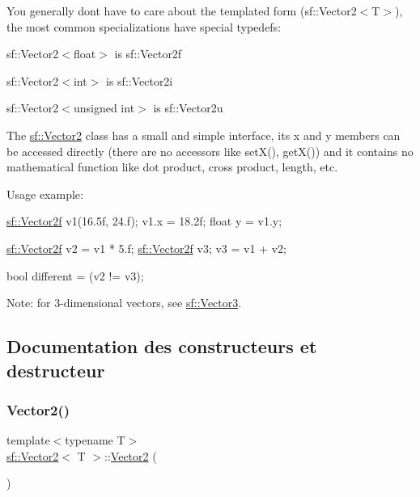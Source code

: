 You generally don\textquotesingle{}t have to care about the templated form (sf\+::\+Vector2$<$\+T$>$), the most common specializations have special typedefs\+: \begin{DoxyItemize}
\item sf\+::\+Vector2$<$float$>$ is sf\+::\+Vector2f \item sf\+::\+Vector2$<$int$>$ is sf\+::\+Vector2i \item sf\+::\+Vector2$<$unsigned int$>$ is sf\+::\+Vector2u\end{DoxyItemize}
The \hyperlink{classsf_1_1Vector2}{sf\+::\+Vector2} class has a small and simple interface, its x and y members can be accessed directly (there are no accessors like set\+X(), get\+X()) and it contains no mathematical function like dot product, cross product, length, etc.

Usage example\+: 
\begin{DoxyCode}
\hyperlink{classsf_1_1Vector2}{sf::Vector2f} v1(16.5f, 24.f);
v1.x = 18.2f;
\textcolor{keywordtype}{float} y = v1.y;

\hyperlink{classsf_1_1Vector2}{sf::Vector2f} v2 = v1 * 5.f;
\hyperlink{classsf_1_1Vector2}{sf::Vector2f} v3;
v3 = v1 + v2;

\textcolor{keywordtype}{bool} different = (v2 != v3);
\end{DoxyCode}


Note\+: for 3-\/dimensional vectors, see \hyperlink{classsf_1_1Vector3}{sf\+::\+Vector3}. 

\subsection{Documentation des constructeurs et destructeur}
\mbox{\label{classsf_1_1Vector2_a58c32383b5291380db4b43a289f75988}} 
\subsubsection{\texorpdfstring{Vector2()}{Vector2()}\hspace{0.1cm}{\footnotesize\ttfamily [1/3]}}
{\footnotesize\ttfamily template$<$typename T$>$ \\
\hyperlink{classsf_1_1Vector2}{sf\+::\+Vector2}$<$ T $>$\+::\hyperlink{classsf_1_1Vector2}{Vector2} (\begin{DoxyParamCaption}{ }\end{DoxyParamCaption})}



